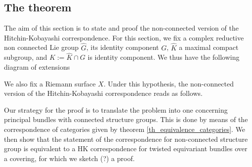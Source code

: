 {\subsection{The theorem}
The aim of this section is to state and proof the non-connected version of the Hitchin-Kobayashi correspondence. For this section, we fix a complex reductive non connected Lie group \(\hat{G}\), its identity component \(G\), \(\hat{K}\) a maximal compact subgroup, and \(K:=\hat{K}\cap G\) is identity component. We thus have the following diagram of extensions
\begin{center}
\end{center}
We also fix a Riemann surface \(X\). Under this hypothesis, the non-connected version of the Hitchin-Kobayashi correspondence reads as follows.


Our strategy for the proof is to translate the problem into one concerning principal bundles with connected structure groups. This is done by means of the correspondence of categories given by theorem \ref{th_equivalence_categories}. We then show that the statement of the correspondence for non-connected structure group is equivalent to a HK correspondence for twisted equivariant bundles over a covering, for which we sketch (?) a proof. 

}
